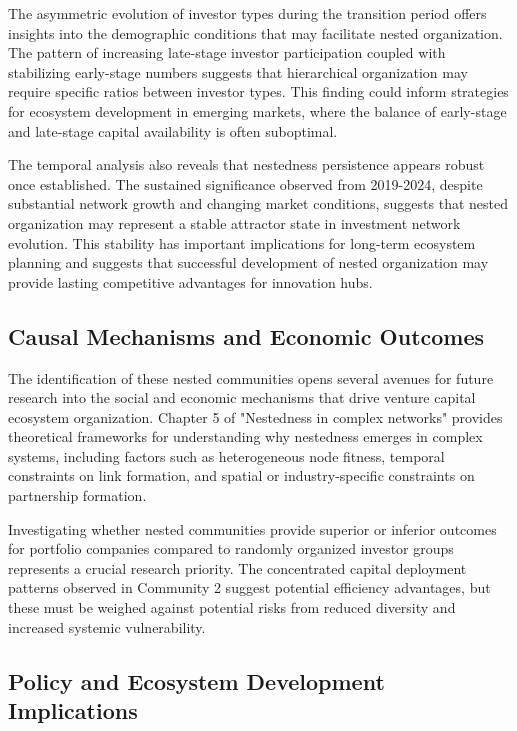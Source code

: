 The asymmetric evolution of investor types during the transition period offers insights into the demographic conditions that may facilitate nested organization. The pattern of increasing late-stage investor participation coupled with stabilizing early-stage numbers suggests that hierarchical organization may require specific ratios between investor types. This finding could inform strategies for ecosystem development in emerging markets, where the balance of early-stage and late-stage capital availability is often suboptimal.

The temporal analysis also reveals that nestedness persistence appears robust once established. The sustained significance observed from 2019-2024, despite substantial network growth and changing market conditions, suggests that nested organization may represent a stable attractor state in investment network evolution. This stability has important implications for long-term ecosystem planning and suggests that successful development of nested organization may provide lasting competitive advantages for innovation hubs.

\subsection{Causal Mechanisms and Economic Outcomes}

The identification of these nested communities opens several avenues for future research into the social and economic mechanisms that drive venture capital ecosystem organization. Chapter 5 of "Nestedness in complex networks" \cite{Mariani2019} provides theoretical frameworks for understanding why nestedness emerges in complex systems, including factors such as heterogeneous node fitness, temporal constraints on link formation, and spatial or industry-specific constraints on partnership formation.

Investigating whether nested communities provide superior or inferior outcomes for portfolio companies compared to randomly organized investor groups represents a crucial research priority. The concentrated capital deployment patterns observed in Community 2 suggest potential efficiency advantages, but these must be weighed against potential risks from reduced diversity and increased systemic vulnerability.

\subsection{Policy and Ecosystem Development Implications}

